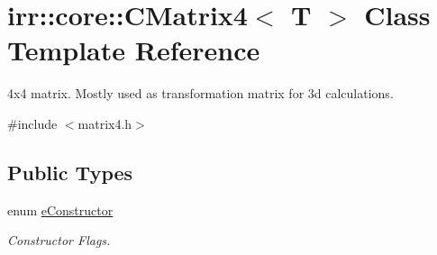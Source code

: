 \hypertarget{classirr_1_1core_1_1CMatrix4}{}\section{irr\+:\+:core\+:\+:C\+Matrix4$<$ T $>$ Class Template Reference}
\label{classirr_1_1core_1_1CMatrix4}


4x4 matrix. Mostly used as transformation matrix for 3d calculations.  




{\ttfamily \#include $<$matrix4.\+h$>$}

\subsection*{Public Types}
\begin{DoxyCompactItemize}
\item 
\mbox{\label{classirr_1_1core_1_1CMatrix4_a7bb79712227617f706ed57a34f3eb4fe}} 
enum \hyperlink{classirr_1_1core_1_1CMatrix4_a7bb79712227617f706ed57a34f3eb4fe}{e\+Constructor} \begin{DoxyCompactList}\small\item\em Constructor Flags. \end{DoxyCompactList}
\end{DoxyCompactItemize}
